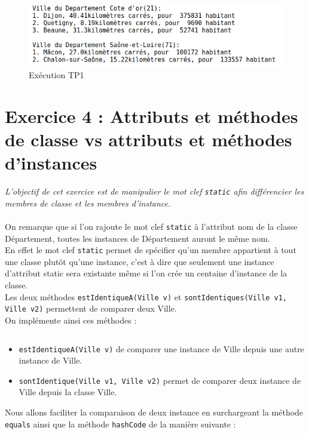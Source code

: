 \begin{figure}[H]
  \centering
  \includegraphics[width=350pt]{./tp/Pictures/tp1-execute}
  \caption{Exécution TP1}
  \label{Exécution TP1}
\end{figure}

\section{Exercice 4 : Attributs et méthodes de classe vs attributs et méthodes d'instances}
\textit{L'objectif de cet exercice est de manipulier le mot clef \texttt{static} afin différencier les membres de classe et les membres d'instance.}
\\\\
On remarque que si l'on rajoute le mot clef \texttt{static} à l'attribut nom de la classe Département, toutes les instances de Département auront le même nom.\\
En effet le mot clef \texttt{static} permet de spécifier qu'un membre appartient à tout une classe plutôt qu'une instance, c'est à dire que seulement une instance d'attribut static sera existante même si l'on crée un centaine d'instance de la classe.\\
Les deux méthodes \texttt{estIdentiqueA(Ville v)} et \texttt{sontIdentiques(Ville v1, Ville v2)} permettent de comparer deux Ville.\\
On implémente ainsi ces méthodes :

\inputminted[linenos,firstline=59,lastline=70]{java}{../sources/src/tp1/Ville.java}

\begin{itemize}
  \item \texttt{estIdentiqueA(Ville v)} de comparer une instance de Ville depuis une autre instance de Ville.
  \item \texttt{sontIdentique(Ville v1, Ville v2)} permet de comparer deux instance de Ville depuis la classe Ville.
\end{itemize}

Nous allons faciliter la comparaison de deux instance en surchargeant la méthode \texttt{equals} ainsi que la méthode \texttt{hashCode} de la manière suivante :
\inputminted[linenos,firstline=72,lastline=89]{java}{../sources/src/tp1/Ville.java}
